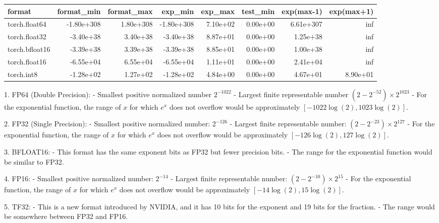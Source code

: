 \begin{table}[h!]
	\centering
	\begin{tabular}{lrrrrrrr}
		\toprule
		format         & format\_min & format\_max & exp\_min   & exp\_max & test\_min & exp(max-1) & exp(max+1) \\
		\midrule
		torch.float64  & -1.80e+308  & 1.80e+308   & -1.80e+308 & 7.10e+02 & 0.00e+00  & 6.61e+307  & inf        \\
		torch.float32  & -3.40e+38   & 3.40e+38    & -3.40e+38  & 8.87e+01 & 0.00e+00  & 1.25e+38   & inf        \\
		torch.bfloat16 & -3.39e+38   & 3.39e+38    & -3.39e+38  & 8.85e+01 & 0.00e+00  & 1.00e+38   & inf        \\
		torch.float16  & -6.55e+04   & 6.55e+04    & -6.55e+04  & 1.11e+01 & 0.00e+00  & 2.41e+04   & inf        \\
		torch.int8     & -1.28e+02   & 1.27e+02    & -1.28e+02  & 4.84e+00 & 0.00e+00  & 4.67e+01   & 8.90e+01   \\
		\bottomrule
	\end{tabular}
\end{table}

1. FP64 (Double Precision):
- Smallest positive normalized number \(2^{-1022}\)
- Largest finite representable number \( (2-2^{-52}) \times 2^{1023} \)
- For the exponential function, the range of \(x\) for which \(e^x\) does not overflow would be approximately \([-1022 \log(2), 1023 \log(2)]\).

2. FP32 (Single Precision):
- Smallest positive normalized number: \(2^{-126}\)
- Largest finite representable number: \( (2-2^{-23}) \times 2^{127} \)
- For the exponential function, the range of \(x\) for which \(e^x\) does not overflow would be approximately \([-126 \log(2), 127 \log(2)]\).

3. BFLOAT16:
- This format has the same exponent bits as FP32 but fewer precision bits.
- The range for the exponential function would be similar to FP32.

4. FP16:
- Smallest positive normalized number: \(2^{-14}\)
- Largest finite representable number: \( (2-2^{-10}) \times 2^{15} \)
- For the exponential function, the range of \(x\) for which \(e^x\) does not overflow would be approximately \([-14 \log(2), 15 \log(2)]\).

5. TF32:
- This is a new format introduced by NVIDIA, and it has 10 bits for the exponent and 19 bits for the fraction.
- The range would be somewhere between FP32 and FP16.

